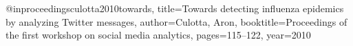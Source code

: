 @inproceedings{culotta2010towards,
  title={Towards detecting influenza epidemics by analyzing Twitter messages},
  author={Culotta, Aron},
  booktitle={Proceedings of the first workshop on social media analytics},
  pages={115--122},
  year={2010}
}
